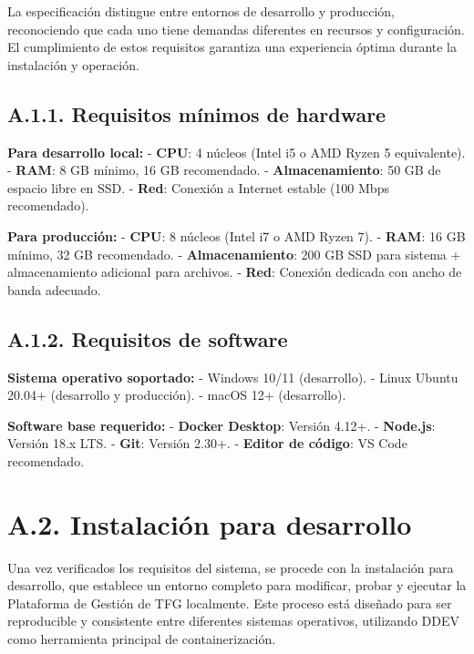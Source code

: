 \documentclass[12pt,a4paper,oneside]{report}
\begin{document}
La especificación distingue entre entornos de desarrollo y producción, reconociendo que cada uno tiene demandas diferentes en recursos y configuración. El cumplimiento de estos requisitos garantiza una experiencia óptima durante la instalación y operación.

\subsection{A.1.1. Requisitos mínimos de
hardware}\label{a.1.1.-requisitos-muxednimos-de-hardware}

\textbf{Para desarrollo local:} - \textbf{CPU}: 4 núcleos (Intel i5 o
AMD Ryzen 5 equivalente). - \textbf{RAM}: 8 GB mínimo, 16 GB
recomendado. - \textbf{Almacenamiento}: 50 GB de espacio libre en SSD. -
\textbf{Red}: Conexión a Internet estable (100 Mbps recomendado).

\textbf{Para producción:} - \textbf{CPU}: 8 núcleos (Intel i7 o AMD
Ryzen 7). - \textbf{RAM}: 16 GB mínimo, 32 GB recomendado. -
\textbf{Almacenamiento}: 200 GB SSD para sistema + almacenamiento
adicional para archivos. - \textbf{Red}: Conexión dedicada con ancho de
banda adecuado.

\subsection{A.1.2. Requisitos de
software}\label{a.1.2.-requisitos-de-software}

\textbf{Sistema operativo soportado:} - Windows 10/11 (desarrollo). -
Linux Ubuntu 20.04+ (desarrollo y producción). - macOS 12+ (desarrollo).

\textbf{Software base requerido:} - \textbf{Docker Desktop}: Versión
4.12+. - \textbf{Node.js}: Versión 18.x LTS. - \textbf{Git}: Versión
2.30+. - \textbf{Editor de código}: VS Code recomendado.

\section{A.2. Instalación para
desarrollo}\label{a.2.-instalaciuxf3n-para-desarrollo}

Una vez verificados los requisitos del sistema, se procede con la instalación para desarrollo, que establece un entorno completo para modificar, probar y ejecutar la Plataforma de Gestión de TFG localmente. Este proceso está diseñado para ser reproducible y consistente entre diferentes sistemas operativos, utilizando DDEV como herramienta principal de containerización.
\end{document}
